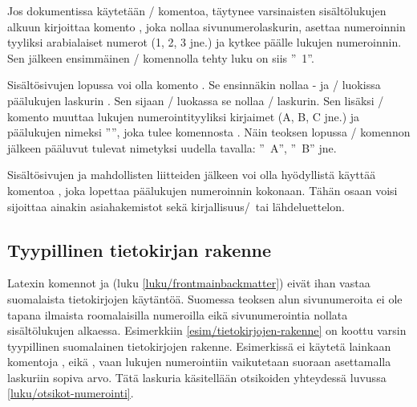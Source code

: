 Jos dokumentissa käytetään \-/ komentoa, täytynee
varsinaisten sisältölukujen alkuun kirjoittaa komento
, joka nollaa sivunumerolaskurin, asettaa
numeroinnin tyyliksi arabialaiset numerot (1, 2, 3 jne.) ja kytkee
päälle lukujen numeroinnin. Sen jälkeen ensimmäinen \-/
komennolla tehty luku on siis ''\chaptername~1''.

Sisältösivujen lopussa voi olla komento . Se
ensinnäkin nollaa - ja \-/ luokissa
päälukujen laskurin . Sen sijaan \-/
luokassa se nollaa \-/ laskurin. Sen lisäksi
\-/ komento muuttaa lukujen numerointityyliksi
kirjaimet (A, B, C jne.) ja päälukujen nimeksi ''\appendixname'', joka
tulee komennosta . Näin teoksen lopussa
\-/ komennon jälkeen pääluvut tulevat nimetyksi
uudella tavalla: ''\appendixname~A'', ''\appendixname~B'' jne.

Sisältösivujen ja mahdollisten liitteiden jälkeen voi olla hyödyllistä
käyttää komentoa , joka lopettaa päälukujen
numeroinnin kokonaan. Tähän osaan voisi sijoittaa ainakin asiahakemistot
sekä kirjallisuus\-/\ tai lähdeluettelon.

\subsection{Tyypillinen tietokirjan rakenne}
\label{luku/tyypillinen-tietokirja}

Latexin komennot  ja  (luku
\ref{luku/frontmainbackmatter}) eivät ihan vastaa suomalaista
tietokirjojen käytäntöä. Suomessa teoksen alun sivunumeroita ei ole
tapana ilmaista roomalaisilla numeroilla eikä sivunumerointia nollata
sisältölukujen alkaessa. Esimerkkiin \ref{esim/tietokirjojen-rakenne} on
koottu varsin tyypillinen suomalainen tietokirjojen rakenne. Esimerkissä
ei käytetä lainkaan komentoja ,
 eikä , vaan lukujen
numerointiin vaikutetaan suoraan asettamalla laskuriin
 sopiva arvo. Tätä laskuria käsitellään otsikoiden
yhteydessä luvussa \ref{luku/otsikot-numerointi}.

